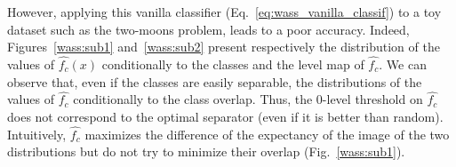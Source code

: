 \documentclass{article}
\newcommand{\W}{\mathcal{W}}
\begin{document}
However, applying this vanilla classifier (Eq.~\eqref{eq:wass_vanilla_classif}) to a toy dataset such as the two-moons problem, leads to a poor accuracy.
Indeed, Figures~\ref{wass:sub1} and~\ref{wass:sub2} present respectively the distribution of the values of $\hat{f_c}(x)$ conditionally to the classes and the level map of $\hat{f_c}$. We can observe that, even if the classes are easily separable, the distributions of the values of $\hat{f_c}$ conditionally to the class overlap. Thus, the 0-level threshold on $\hat{f_c}$ does not correspond to the optimal separator (even if it is better than random). Intuitively, $\hat{f_c}$  
maximizes the difference of the expectancy of the image of  
the two distributions but do not try to minimize their overlap (Fig.~\ref{wass:sub1}). 
\end{document}
